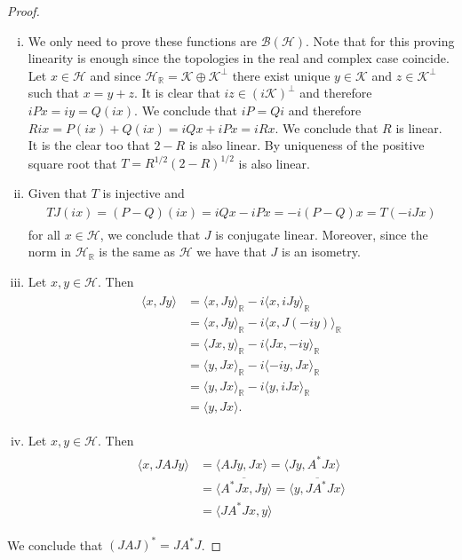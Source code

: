 \begin{proof}
\begin{enumerate}[(i)]
\item We only need to prove these functions are $\mathcal{B}(\mathcal{H})$. Note that for this proving linearity is enough since the topologies in the real and complex case coincide. Let $x\in\mathcal{H}$ and since $\mathcal{H}_\mathbb{R}=\mathcal{K}\oplus\mathcal{K}^\bot$ there exist unique $y\in\mathcal{K}$ and $z\in\mathcal{K}^\bot$ such that $x=y+z$. It is clear that $iz\in(i\mathcal{K})^\bot$ and therefore $iPx=iy=Q(ix)$. We conclude that $iP=Qi$ and therefore $Rix=P(ix)+Q(ix)=iQx+iPx=iRx$. We conclude that $R$ is linear. It is the clear too that $2-R$ is also linear. By uniqueness of the positive square root that $T=R^{1/2}(2-R)^{1/2}$ is also linear.
\item Given that $T$ is injective and 
\begin{align}
\begin{split}
TJ(ix)=(P-Q)(ix)=iQx-iPx=-i(P-Q)x=T(-iJx)
\end{split}
\end{align}
for all $x\in\mathcal{H}$, we conclude that $J$ is conjugate linear. Moreover, since the norm in $\mathcal{H}_\mathbb{R}$ is the same as $\mathcal{H}$ we have that $J$ is an isometry.
\item Let $x,y\in\mathcal{H}$. Then
\begin{align}
\begin{split}
\langle x,Jy\rangle &= \langle x,Jy\rangle_\mathbb{R}-i\langle x,iJy\rangle_\mathbb{R} \\
&= \langle x,Jy\rangle_\mathbb{R}-i\langle x,J(-iy)\rangle_\mathbb{R} \\
&= \langle Jx,y\rangle_\mathbb{R}-i\langle Jx,-iy\rangle_\mathbb{R} \\
&= \langle y,Jx\rangle_\mathbb{R}-i\langle -iy,Jx\rangle_\mathbb{R} \\
&= \langle y,Jx\rangle_\mathbb{R}-i\langle y,iJx\rangle_\mathbb{R} \\
&= \langle y,Jx \rangle.
\end{split}
\end{align}
\item Let $x,y\in\mathcal{H}$. Then
\begin{align}
\begin{split}
\langle x,JAJy \rangle &= \langle AJy, Jx\rangle = \langle Jy, A^*Jx\rangle \\
&= \overline{\langle A^*Jx,Jy\rangle}=\overline{\langle y, JA^*Jx\rangle} \\
&= \langle JA^*Jx,y\rangle
\end{split}
\end{align}
\end{enumerate}
We conclude that $(JAJ)^*=JA^*J$.
\end{proof}

